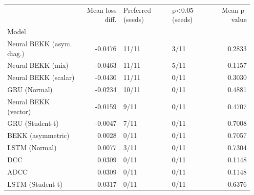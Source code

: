 \begin{tabular}{lrllr}
\toprule
 & Mean loss diff. & Preferred (seeds) & p<0.05 (seeds) & Mean p-value \\
Model &  &  &  &  \\
\midrule
Neural BEKK (asym. diag.) & -0.0476 & 11/11 & 3/11 & 0.2833 \\
Neural BEKK (mix) & -0.0463 & 11/11 & 5/11 & 0.1157 \\
Neural BEKK (scalar) & -0.0430 & 11/11 & 0/11 & 0.3030 \\
GRU (Normal) & -0.0234 & 10/11 & 0/11 & 0.4881 \\
Neural BEKK (vector) & -0.0159 & 9/11 & 0/11 & 0.4707 \\
GRU (Student-t) & -0.0047 & 7/11 & 0/11 & 0.7008 \\
BEKK (asymmetric) & 0.0028 & 0/11 & 0/11 & 0.7057 \\
LSTM (Normal) & 0.0077 & 3/11 & 0/11 & 0.7304 \\
DCC & 0.0309 & 0/11 & 0/11 & 0.1148 \\
ADCC & 0.0309 & 0/11 & 0/11 & 0.1148 \\
LSTM (Student-t) & 0.0317 & 0/11 & 0/11 & 0.6376 \\
\bottomrule
\end{tabular}
